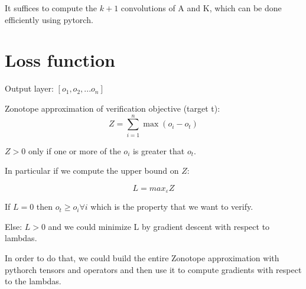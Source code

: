\documentclass{article}
\newcommand{\eps}{\varepsilon}
\begin{document}
It suffices to compute the $k+1$ convolutions of A and K, which can be done efficiently using pytorch.



\section{Loss function}

Output layer: $[o_1, o_2, ... o_n]$

Zonotope approximation of verification objective (target t):
\begin{equation}
Z = \sum_{i=1}^{n} \max(o_i - o_t)
\end{equation}

$Z > 0$ only if one or more of the $o_i$ is greater that $o_t$.

In particular if we compute the upper bound on $Z$:

\begin{equation}
L = max_\eps Z
\end{equation}

If $L = 0$ then $o_t \geq o_i \forall i$ which is the property that we want to verify.

Else: $L > 0$ and we could minimize L by gradient descent with respect to lambdas.

In order to do that, we could build the entire Zonotope approximation with pythorch tensors and operators and then use it to compute gradients with respect to the lambdas.
\end{document}
